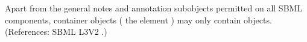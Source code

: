 Apart from the general notes and annotation subobjects permitted on all
SBML components, \ListOfModifierSpeciesReferences container objects (\ie
the \Reaction element ) may only contain
\ModifierSpeciesReference objects.  (References: SBML L3V2
.)
